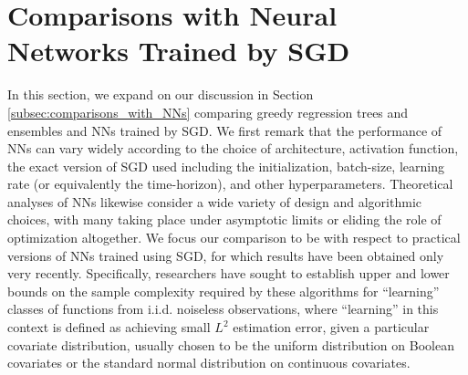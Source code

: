 \documentclass[11pt]{article}
\begin{document}
\section{Comparisons with Neural Networks Trained by SGD}
\label{sec:related_work}

In this section, we expand on our discussion in Section \ref{subsec:comparisons_with_NNs} comparing greedy regression trees and ensembles and NNs trained by SGD.
We first remark that the performance of NNs can vary widely according to the choice of architecture, activation function, the exact version of SGD used including the initialization, batch-size, learning rate (or equivalently the time-horizon), and other hyperparameters.
Theoretical analyses of NNs likewise consider a wide variety of design and algorithmic choices, with many taking place under asymptotic limits or eliding the role of optimization altogether.
We focus our comparison to be with respect to practical versions of NNs trained using SGD, for which results have been obtained only very recently.
Specifically, researchers have sought to establish upper and lower bounds on the sample complexity required by these algorithms for “learning” classes of functions from i.i.d. noiseless observations, where “learning” in this context is defined as achieving small $L^2$ estimation error, given a particular covariate distribution, usually chosen to be the uniform distribution on Boolean covariates or the standard normal distribution on continuous covariates.
\end{document}
